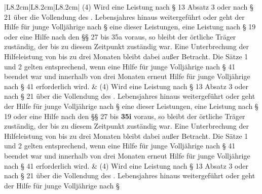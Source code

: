 \documentclass[10pt,a4paper,landscape]{article}
\begin{document}
\begin{longtable}{|L{8.2cm}|L{8.2cm}|L{8.2cm}|}
\hhline{|---|}
(4) Wird eine Leistung nach \S{} 13 Absatz 3  \newline oder nach \S{} 21 über die Vollendung des  . Lebensjahres hinaus weitergeführt oder  \newline geht der Hilfe für junge Volljährige nach \S{}   eine dieser Leistungen, eine Leistung  \newline nach \S{} 19 oder eine Hilfe nach den \S{}\S{} 27  \newline bis \textcolor{diffred}{35a} voraus, so bleibt der örtliche Träger  \newline zuständig, der bis zu diesem Zeitpunkt  \newline zuständig war. Eine Unterbrechung der  \newline Hilfeleistung von bis zu drei Monaten bleibt  \newline dabei außer Betracht. Die Sätze 1 und 2  \newline gelten entsprechend, wenn eine Hilfe für  \newline junge Volljährige nach \S{} 41 beendet war  \newline und innerhalb von drei Monaten erneut  \newline Hilfe für junge Volljährige nach \S{} 41  \newline erforderlich wird. & (4) Wird eine Leistung nach \S{} 13 Absatz 3  \newline oder nach \S{} 21 über die Vollendung des  . Lebensjahres hinaus weitergeführt oder  \newline geht der Hilfe für junge Volljährige nach \S{}   eine dieser Leistungen, eine Leistung  \newline nach \S{} 19 oder eine Hilfe nach den \S{}\S{} 27  \newline bis \textbf{35i} voraus, so bleibt der örtliche Träger  \newline zuständig, der bis zu diesem Zeitpunkt  \newline zuständig war. Eine Unterbrechung der  \newline Hilfeleistung von bis zu drei Monaten bleibt  \newline dabei außer Betracht. Die Sätze 1 und 2  \newline gelten entsprechend, wenn eine Hilfe für  \newline junge Volljährige nach \S{} 41 beendet war  \newline und innerhalb von drei Monaten erneut  \newline Hilfe für junge Volljährige nach \S{} 41  \newline erforderlich wird. & (4) Wird eine Leistung nach \S{} 13 Absatz 3  \newline oder nach \S{} 21 über die Vollendung des  . Lebensjahres hinaus weitergeführt oder  \newline geht der Hilfe für junge Volljährige nach \S{}  \newline 
\end{longtable}
\end{document}
